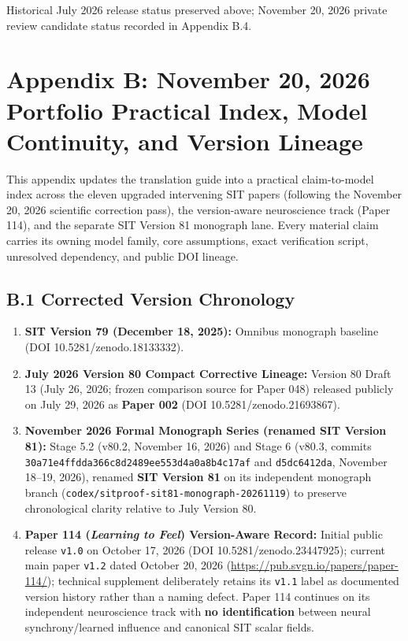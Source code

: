 \documentclass[
  american,
  11pt,
  letterpaper,
]{article}
\providecommand{\tightlist}{%
  \setlength{\itemsep}{0pt}\setlength{\parskip}{0pt}}
\begin{document}
Historical July 2026 release status preserved above; November 20, 2026 private review candidate status recorded in Appendix B.4.

\section{Appendix B: November 20, 2026 Portfolio Practical Index, Model Continuity, and Version Lineage}\label{appendix-b-november-20-2026-portfolio-practical-index-model-continuity-and-version-lineage}

This appendix updates the translation guide into a practical claim-to-model index across the eleven upgraded intervening SIT papers (following the November 20, 2026 scientific correction pass), the version-aware neuroscience track (Paper 114), and the separate SIT Version 81 monograph lane. Every material claim carries its owning model family, core assumptions, exact verification script, unresolved dependency, and public DOI lineage.

\subsection{B.1 Corrected Version Chronology}\label{b.1-corrected-version-chronology}

\begin{enumerate}
\def\labelenumi{\arabic{enumi}.}
\tightlist
\item
  \textbf{SIT Version 79 (December 18, 2025):} Omnibus monograph baseline (DOI 10.5281/zenodo.18133332).
\item
  \textbf{July 2026 Version 80 Compact Corrective Lineage:} Version 80 Draft 13 (July 26, 2026; frozen comparison source for Paper 048) released publicly on July 29, 2026 as \textbf{Paper 002} (DOI 10.5281/zenodo.21693867).
\item
  \textbf{November 2026 Formal Monograph Series (renamed SIT Version 81):} Stage 5.2 (v80.2, November 16, 2026) and Stage 6 (v80.3, commits \nolinkurl{30a71e4ffdda366c8d2489ee553d4a0a8b4c17af} and \texttt{d5dc6412da}, November 18--19, 2026), renamed \textbf{SIT Version 81} on its independent monograph branch (\nolinkurl{codex/sitproof-sit81-monograph-20261119}) to preserve chronological clarity relative to July Version 80.
\item
  \textbf{Paper 114 (\emph{Learning to Feel}) Version-Aware Record:} Initial public release \texttt{v1.0} on October 17, 2026 (DOI 10.5281/zenodo.23447925); current main paper \texttt{v1.2} dated October 20, 2026 (\url{https://pub.svgn.io/papers/paper-114/}); technical supplement deliberately retains its \texttt{v1.1} label as documented version history rather than a naming defect. Paper 114 continues on its independent neuroscience track with \textbf{no identification} between neural synchrony/learned influence and canonical SIT scalar fields.
\end{enumerate}
\end{document}
